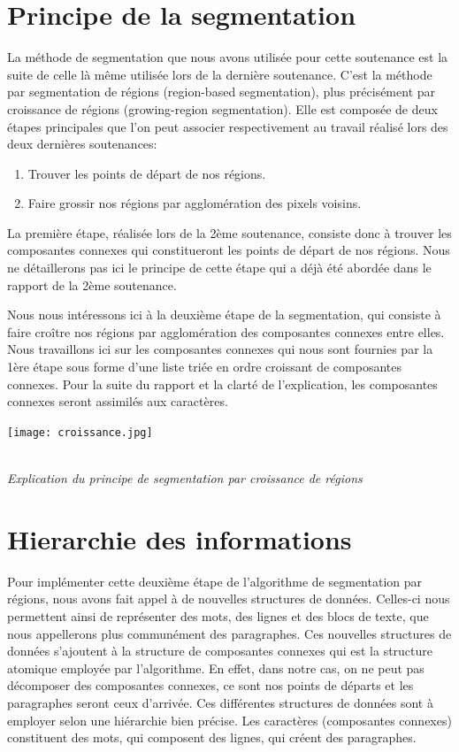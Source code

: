 \documentclass[a4paper,12pt]{report}
\begin{document}
\section{Principe de la segmentation}

La méthode de segmentation que nous avons utilisée pour cette soutenance est la suite
de celle là même utilisée lors de la dernière soutenance. C'est la méthode par segmentation
de régions (region-based segmentation), plus précis\'ement par croissance de régions
(growing-region segmentation). Elle est composée de deux étapes principales que l'on peut
associer respectivement au travail réalisé lors des deux dernières soutenances:

\begin{enumerate}
\item Trouver les points de départ de nos régions.
\item Faire grossir nos régions par agglomération des pixels voisins.
\end{enumerate}

La première étape, réalisée lors de la 2ème soutenance, consiste donc à trouver les
composantes connexes qui constitueront les points de départ de nos régions. Nous ne
détaillerons pas ici le principe de cette étape qui a déjà été abordée dans le rapport de la
2ème soutenance.

Nous nous intéressons ici à la deuxième étape de la segmentation, qui consiste à faire
croître nos régions par agglomération des composantes connexes entre elles. Nous
travaillons ici sur les composantes connexes qui nous sont fournies par la 1ère étape sous
forme d'une liste triée en ordre croissant de composantes connexes. Pour la suite du
rapport et la clarté de l'explication, les composantes connexes seront
assimilés aux caractères.

\begin{center}
  \texttt{[image: croissance.jpg]}
  \caption{\\\emph{Explication du principe de segmentation par croissance de r\'egions}}
\end{center}



\section{Hierarchie des informations}

Pour implémenter cette deuxième étape de l'algorithme de segmentation par régions,
nous avons fait appel à de nouvelles structures de données. Celles-ci nous permettent
ainsi de représenter des mots, des lignes et des blocs de texte, que nous appellerons plus
communément des paragraphes. Ces nouvelles structures de données s'ajoutent à la
structure de composantes connexes qui est la structure atomique employée par
l'algorithme. En effet, dans notre cas, on ne peut pas décomposer des composantes
connexes, ce sont nos points de départs et les paragraphes seront ceux d'arrivée. Ces
différentes structures de données sont à employer selon une hiérarchie bien précise. Les
caractères (composantes connexes) constituent des mots, qui composent des lignes, qui
créent des paragraphes.
\end{document}

